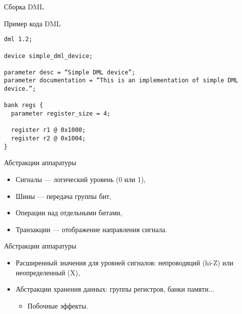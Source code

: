 \begin{frame}{Сборка DML}

\begin{figure}[htp]
    \centering
\end{figure}

\end{frame}

\begin{frame}[fragile]{Пример кода DML}

\begin{lstlisting}
dml 1.2;

device simple_dml_device;

parameter desc = “Simple DML device”;
parameter documentation = “This is an implementation of simple DML device.”;

bank regs {
  parameter register_size = 4;

  register r1 @ 0x1000;
  register r2 @ 0x1004;
}
\end{lstlisting}

\end{frame}


\begin{frame}{Абстракции аппаратуры}

\begin{itemize}
    \item Сигналы --- логический уровень (0 или 1),
    \item Шины --- передача группы бит,
    \item Операции над отдельными битами,
    \item Транзакции --- отображение направления сигнала.
\end{itemize}

\end{frame}

\begin{frame}{Абстракции аппаратуры}

\begin{itemize}
    \item Расширенный значения для уровней сигналов: непроводяций (hi-Z) или неопределенный (X),
    \item Абстракции хранения данных: группы регистров, банки памяти...
    \begin{itemize}
        \item Побочные эффекты.
    \end{itemize}
\end{itemize}

\end{frame}

